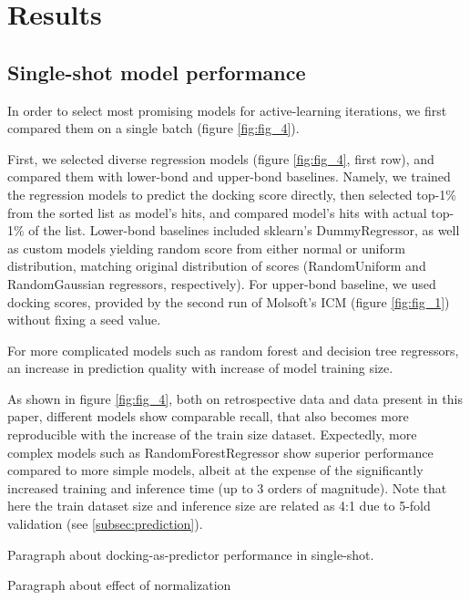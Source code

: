 \section{Results}

\subsection{Single-shot model performance}

In order to select most promising models for active-learning iterations, we first compared them on a single batch (figure \ref{fig:fig_4}). 

First, we selected diverse regression models (figure \ref{fig:fig_4}, first row), and compared them with lower-bond and upper-bond baselines. Namely, we trained the regression models to predict the docking score directly, then selected top-1\% from the sorted list as model's hits, and compared model's hits with actual top-1\% of the list. Lower-bond baselines included sklearn's DummyRegressor, as well as custom models yielding random score from either normal or uniform distribution, matching original distribution of scores (RandomUniform and RandomGaussian regressors, respectively). For upper-bond baseline, we used docking scores, provided by the second run of Molsoft's ICM (figure \ref{fig:fig_1}) without fixing a seed value.



For more complicated models such as random forest and decision tree regressors, an increase in prediction quality with increase of model training size. 

As shown in figure \ref{fig:fig_4}, both on retrospective data \cite{ultralarge_docking_first} and data present in this paper, different models show comparable recall, that also becomes more reproducible with the increase of the train size dataset. Expectedly, more complex models such as RandomForestRegressor show superior performance compared to more simple models, albeit at the expense of the significantly increased training and inference time (up to 3 orders of magnitude). Note that here the train dataset size and inference size are related as 4:1 due to 5-fold validation (see \ref{subsec:prediction}). 

Paragraph about docking-as-predictor performance in single-shot.

Paragraph about effect of normalization

